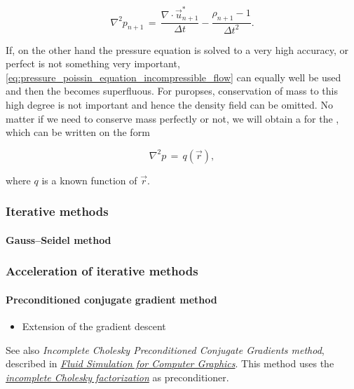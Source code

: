 \begin{equation} \label{eq:pressure_poissin_equation_density_conservation}
\nabla^2 p_{n+1} \,=\, \frac{\nabla\cdot\vec{u}^*_{n+1}}{\Delta t} - \frac{\rho_{n+1} - 1}{\Delta t^2}.
\end{equation}

If, on the other hand the pressure equation is solved to a very high accuracy, or perfect  is not something very important, \eqref{eq:pressure_poissin_equation_incompressible_flow} can equally well be used and then the  becomes superfluous. For \simulation puropses, conservation of mass to this high degree is not important and hence the density field can be omitted. No matter if we need to conserve mass perfectly or not, we will obtain a  for the , which can be written on the form

\begin{equation} \label{eq:pressure_poissin_equation_general}
\nabla^2 p \,=\, q(\vec{r}),
\end{equation}

where $q$ is a known function of $\vec{r}$.

\subsubsection{Iterative methods}

\paragraph{Gauss--Seidel method}

\subsubsection{Acceleration of iterative methods}

\paragraph{Preconditioned conjugate gradient method}

\begin{itemize}
    \item Extension of the gradient descent
\end{itemize}

See also \textit{Incomplete Cholesky Preconditioned Conjugate Gradients method}, described in \textit{\href{http://www.cs.ubc.ca/~rbridson/fluidbook/}{Fluid Simulation for Computer Graphics}}. This method uses the \textit{\href{http://en.wikipedia.org/wiki/Incomplete_Cholesky_factorization}{incomplete Cholesky factorization}} as preconditioner.

